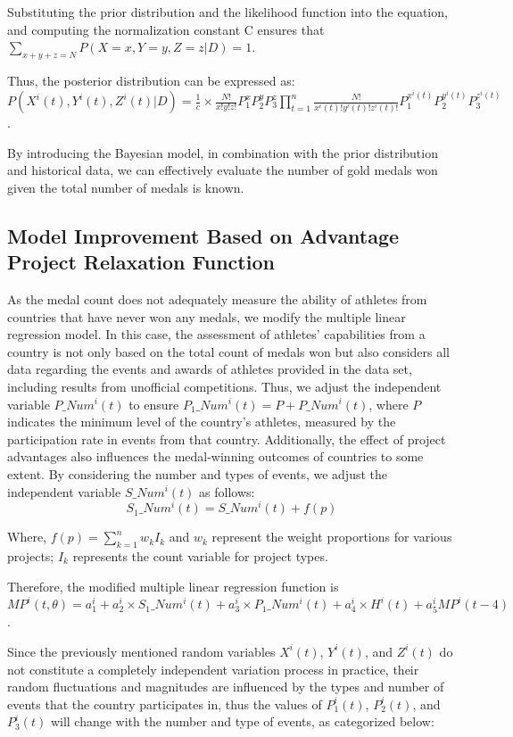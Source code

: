 \documentclass{mcmthesis}
\begin{document}
Substituting the prior distribution and the likelihood function into the equation, and computing the normalization constant C ensures that $\sum_{x+y+z=N}P(X=x, Y=y, Z=z|D)=1$.

Thus, the posterior distribution can be expressed as: $P(X^{i}(t), Y^{i}(t), Z^{i}(t)|D) = \frac{1}{c} \times \frac{N!}{x!y!z!}P_{1}^{x}P_{2}^{y}P_{3}^{z}\prod_{t=1}^{n}\frac{N!}{x^{i}(t)!y^{i}(t)!z^{i}(t)!}P_{1}^{x^{i}(t)}P_{2}^{y^{i}(t)}P_{3}^{z^{i}(t)}$.

By introducing the Bayesian model, in combination with the prior distribution and historical data, we can effectively evaluate the number of gold medals won given the total number of medals is known.

\subsection{Model Improvement Based on Advantage Project Relaxation Function}
As the medal count does not adequately measure the ability of athletes from countries that have never won any medals, we modify the multiple linear regression model. In this case, the assessment of athletes' capabilities from a country is not only based on the total count of medals won but also considers all data regarding the events and awards of athletes provided in the data set, including results from unofficial competitions. Thus, we adjust the independent variable $P\_Num^{i}(t)$ to ensure $P_{1}\_Num^{i}(t) = P+P\_Num^{i}(t)$, where $P$ indicates the minimum level of the country's athletes, measured by the participation rate in events from that country. Additionally, the effect of project advantages also influences the medal-winning outcomes of countries to some extent. By considering the number and types of events, we adjust the independent variable $S\_Num^{i}(t)$ as follows:
\begin{equation}
S_{1}\_Num^{i}(t) = S\_Num^{i}(t) + f(p)
\end{equation}

Where, $f(p) = \sum_{k=1}^{n}w_{k}I_{k}$ and $w_{k}$ represent the weight proportions for various projects; $I_{k}$ represents the count variable for project types.

Therefore, the modified multiple linear regression function is $MP^{i}(t, \theta) = a_{1}^{i}+a_{2}^{i}\times S_{1}\_Num^{i}(t) + a_{3}^{i}\times P_{1}\_Num^{i}(t) + a_{4}^{i}\times H^{i}(t) + a_{5}^{i}MP^{i}(t-4)$.

Since the previously mentioned random variables $X^{i}(t)$, $Y^{i}(t)$, and $Z^{i}(t)$ do not constitute a completely independent variation process in practice, their random fluctuations and magnitudes are influenced by the types and number of events that the country participates in, thus the values of $P_{1}^{i}(t)$, $P_{2}^{i}(t)$, and $P_{3}^{i}(t)$ will change with the number and type of events, as categorized below:
\end{document}
